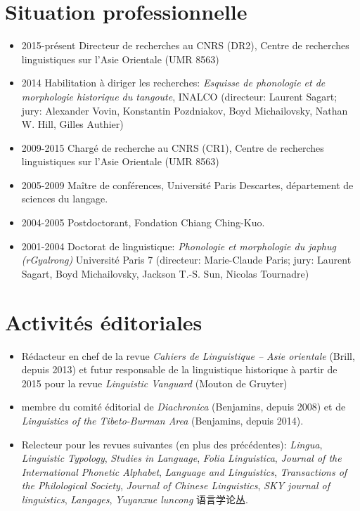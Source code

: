 \documentclass[oldfontcommands,oneside,a4paper,11pt]{article}
\newcommand{\zh}[1]{{\cn #1}}
\begin{document}
\section*{Situation professionnelle}
\begin{itemize}
\item 2015-présent Directeur de recherches au CNRS (DR2), Centre de recherches linguistiques sur l'Asie Orientale (UMR 8563)
\item 2014 Habilitation à diriger les recherches: \textit{Esquisse de phonologie et de morphologie historique du tangoute}, INALCO  (directeur: Laurent Sagart; jury: Alexander Vovin, Konstantin Pozdniakov, Boyd Michailovsky, Nathan W. Hill, Gilles Authier)
\item 2009-2015 Chargé de recherche au CNRS (CR1), Centre de recherches linguistiques sur l'Asie Orientale (UMR 8563)
\item 2005-2009 Maître de conférences, Université Paris Descartes, département de sciences du langage.
\item 2004-2005 Postdoctorant, Fondation Chiang Ching-Kuo.
\item 2001-2004 Doctorat de linguistique: \textit{Phonologie et morphologie du japhug (rGyalrong)} Université Paris 7 (directeur: Marie-Claude Paris; jury: Laurent Sagart, Boyd Michailovsky, Jackson T.-S. Sun, Nicolas Tournadre)
\end{itemize}
 
 
  
  
 
\section*{Activités éditoriales}
\begin{itemize}
\item Rédacteur en chef de la revue \textit{Cahiers de Linguistique -- Asie orientale} (Brill, depuis 2013) et futur responsable de la linguistique historique à partir de 2015 pour la revue \textit{Linguistic Vanguard} (Mouton de Gruyter)
\item membre du comité éditorial de \textit{Diachronica} (Benjamins, depuis 2008) et de \textit{Linguistics of the Tibeto-Burman Area}  (Benjamins, depuis 2014).
\item Relecteur pour les revues suivantes (en plus des précédentes): \textit{Lingua}, \textit{Linguistic Typology}, \textit{Studies in Language}, \textit{Folia Linguistica}, \textit{Journal of the International Phonetic Alphabet},  \textit{Language and Linguistics}, \textit{Transactions of the Philological Society}, \textit{Journal of Chinese Linguistics}, \textit{SKY journal of linguistics}, \textit{Langages}, \textit{Yuyanxue luncong} \zh{语言学论丛}.
\end{itemize}
\end{document}

